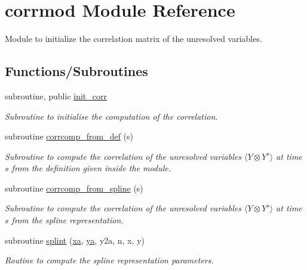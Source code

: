 \hypertarget{namespacecorrmod}{}\section{corrmod Module Reference}
\label{namespacecorrmod}


Module to initialize the correlation matrix of the unresolved variables.  


\subsection*{Functions/\+Subroutines}
\begin{DoxyCompactItemize}
\item 
subroutine, public \hyperlink{namespacecorrmod_ac2e966d475b93a6f75961bc7b7cceb7d}{init\+\_\+corr}
\begin{DoxyCompactList}\small\item\em Subroutine to initialise the computation of the correlation. \end{DoxyCompactList}\item 
subroutine \hyperlink{namespacecorrmod_a52bbdab69c73b4313857d71c07cb3164}{corrcomp\+\_\+from\+\_\+def} (s)
\begin{DoxyCompactList}\small\item\em Subroutine to compute the correlation of the unresolved variables $\langle Y \otimes Y^s \rangle$ at time $s$ from the definition given inside the module. \end{DoxyCompactList}\item 
subroutine \hyperlink{namespacecorrmod_a4afc40b6c94d00fc18ccc378ad309a7f}{corrcomp\+\_\+from\+\_\+spline} (s)
\begin{DoxyCompactList}\small\item\em Subroutine to compute the correlation of the unresolved variables $\langle Y \otimes Y^s \rangle$ at time $s$ from the spline representation. \end{DoxyCompactList}\item 
subroutine \hyperlink{namespacecorrmod_a870374ab1a440e562713b6cdc23e18e1}{splint} (\hyperlink{namespacecorrmod_a4af3bd2a2042f69a0fc89df8eba38de7}{xa}, \hyperlink{namespacecorrmod_aae7d37a1064807c18f234f1c74d46afc}{ya}, y2a, n, x, y)
\begin{DoxyCompactList}\small\item\em Routine to compute the spline representation parameters. \end{DoxyCompactList}\item 

\end{DoxyCompactItemize}
